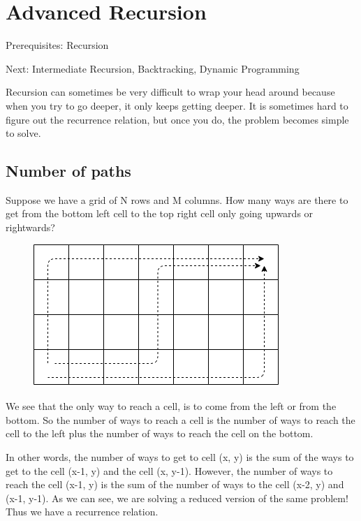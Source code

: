 \documentclass[11pt,oneside]{book}
\makeatletter
\def\maxwidth#1{\ifdim\Gin@nat@width>#1 #1\else\Gin@nat@width\fi}
\makeatother
\begin{document}
        \section{ Advanced Recursion }
        

Prerequisites: Recursion

Next: Intermediate Recursion, Backtracking, Dynamic Programming

Recursion can sometimes be very difficult to wrap your head around because when you try to go deeper, it only keeps getting deeper. It is sometimes hard to figure out the recurrence relation, but once you do, the problem becomes simple to solve.

\subsection{Number of paths}

Suppose we have a grid of N rows and M columns. How many ways are there to get from the bottom left cell to the top right cell only going upwards or rightwards?

\vspace{5px}\begin{figure}[H]\centering
        \includegraphics[width=0.66\maxwidth{\textwidth}]{recursion_grid.png}
        \end{figure}

We see that the only way to reach a cell, is to come from the left or from the bottom. So the number of ways to reach a cell is the number of ways to reach the cell to the left plus the number of ways to reach the cell on the bottom.

In other words, the number of ways to get to cell (x, y) is the sum of the ways to get to the cell (x-1, y) and the cell (x, y-1). However, the number of ways to reach the cell (x-1, y) is the sum of the number of ways to the cell (x-2, y) and (x-1, y-1). As we can see, we are solving a reduced version of the same problem! Thus we have a recurrence relation.
\end{document}
